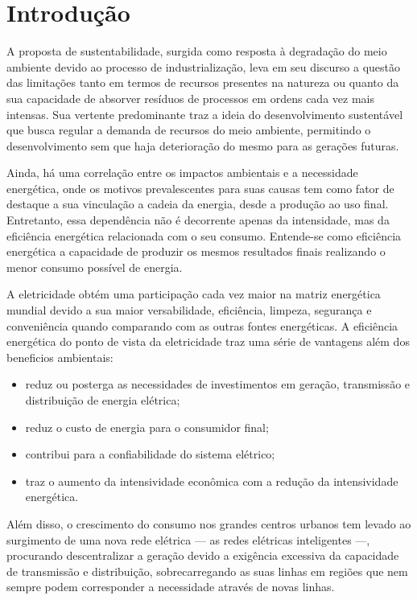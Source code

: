 \chapter{Introdução}

A proposta de sustentabilidade, surgida como resposta à degradação do
meio ambiente devido ao processo de industrialização, leva em seu
discurso a questão das limitações tanto em termos de recursos
presentes na natureza ou quanto da sua capacidade de absorver resíduos
de processos em ordens cada vez mais intensas. Sua vertente
predominante traz a ideia do desenvolvimento sustentável que busca
regular a demanda de recursos do meio ambiente, permitindo o
desenvolvimento sem que haja deterioração do mesmo para as gerações
futuras.

Ainda, há uma correlação entre os impactos ambientais e a necessidade
energética, onde os motivos prevalescentes para suas causas tem como
fator de destaque a sua vinculação a cadeia da energia, desde a
produção ao uso final. Entretanto, essa dependência não é decorrente
apenas da intensidade, mas da eficiência energética relacionada com o
seu consumo. Entende-se como eficiência energética a capacidade de
produzir os mesmos resultados finais realizando o menor consumo
possível de energia.

A eletricidade obtém uma participação cada vez maior na matriz
energética mundial devido a sua maior versabilidade, eficiência,
limpeza, segurança e conveniência quando comparando com as outras
fontes energéticas. A eficiência energética do ponto de vista da
eletricidade traz uma série de vantagens além dos beneficios
ambientais:

\begin{itemize}
\item reduz ou posterga as necessidades de investimentos em geração, transmissão 
e distribuição de energia elétrica; 
\item reduz o custo de energia para o consumidor final; 
\item contribui para a confiabilidade do sistema elétrico; 
\item traz o aumento da intensividade econômica com a redução da intensividade
energética. 
\end{itemize}

Além disso, o crescimento do consumo nos grandes centros urbanos tem
levado ao surgimento de uma nova rede elétrica --- as redes elétricas
inteligentes ---, procurando descentralizar a geração devido a
exigência excessiva da capacidade de transmissão e distribuição,
sobrecarregando as suas linhas em regiões que nem sempre podem
corresponder a necessidade através de novas linhas. 

